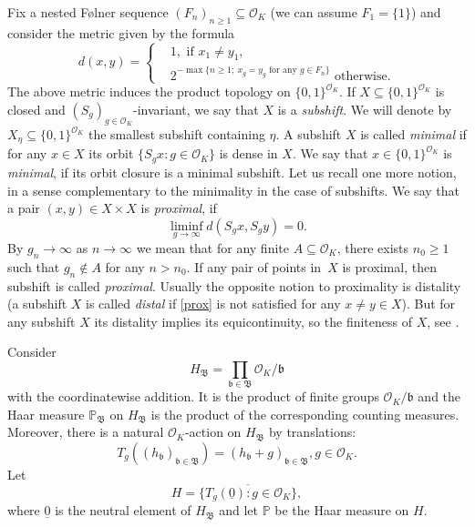 \documentclass[leqno,a4paper,12pt]{article}
\theoremstyle{definition}
\newtheorem{Remark}[Th]{Remark}
\newcommand{\PP}{{\mathbb{P}}}
\newcommand{\OK}{\mathcal{O}_K}
\begin{document}
Fix a nested F\o lner sequence $(F_n)_{n\geq1}\subseteq\OK$ (we can assume $F_1=\{1\}$) and consider the metric given by the formula
\begin{equation}\label{metryka}
d(x,y)=\begin{cases}
&1, \text{ if } x_1\neq y_1, \\
&2^{-\max\{n\geq1 ;\ x_g=y_g \text{ for any } g\in F_n \} } \text{ otherwise.}
\end{cases}
\end{equation}
The above metric induces the product topology on $\{0,1\}^{\OK}$.
If $X\subseteq \{0,1\}^{\OK}$ is closed and ${(S_g)}_{g\in\OK}$-invariant, we say that $X$ is a \emph{subshift}. We will denote by $X_\eta\subseteq \{0,1\}^{\mathcal{O}_K}$ the smallest subshift containing $\eta$. A subshift $X$ is called \emph{minimal} if for any $x\in X$ its orbit $\{S_gx: g\in\OK\}$ is dense in $X$. We say that $x\in \{0,1\}^{\OK}$ is \emph{minimal}, if its orbit closure is a minimal subshift. Let us recall one more notion, in a sense complementary to the minimality in the case of subshifts. We say that a pair $(x,y)\in X\times X$ is \emph{proximal}, if \begin{equation}\label{prox}
\liminf_{g\to\infty}d(S_gx,S_gy)=0.
\end{equation}
By $g_n\to\infty$ as $n\to\infty$ we mean that for any finite $A\subseteq\OK$, there exists $n_0\geq1$ such that $g_n\not\in A$ for any $n>n_0$. If any pair of points in~$X$ is proximal, then subshift is called {\em proximal}. Usually the opposite notion to proximality is distality (a subshift $X$ is called \emph{distal} if \eqref{prox} is not satisfied for any $x\neq y\in X$). But for any subshift $X$ its distality implies its equicontinuity, so the finiteness of $X$, see \cite[Theorem 2]{MR101283}.

Consider
\begin{equation*}
H_\mathfrak{B}=\prod_{\mathfrak{b}\in\mathfrak{B}}\mathcal{O}_K/{\mathfrak{b}}
\end{equation*}
with the coordinatewise addition. It is the product of finite groups $\OK/{\mathfrak{b}}$ and the Haar measure $\PP_\mathfrak{B}$ on $H_\mathfrak{B}$ is the product of the corresponding counting measures. Moreover, there is a natural $\mathcal{O}_K$-action on $H_\mathfrak{B}$ by translations:
\begin{equation*}\label{eq:rota}
T_g((h_{\mathfrak{b}})_{\mathfrak{b}\in\mathfrak{B}})=(h_\mathfrak{b}+g)_{\mathfrak{b}\in\mathfrak{B}}, g\in\OK.
\end{equation*}
Let
\begin{equation}\label{eq:grupa}
H=\overline{\{T_g(\underline{0}):g\in\OK\}},
\end{equation}
where $\underline{0}$ is the neutral element of $H_\mathfrak{B}$ and let $\PP$ be the Haar measure on $H$.
\end{document}
